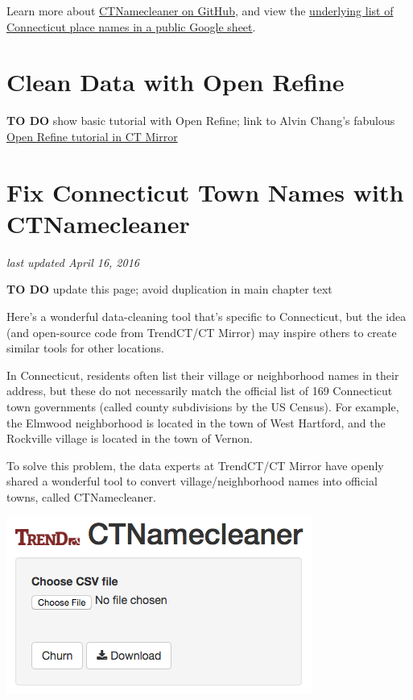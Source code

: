 \documentclass[
  english,
]{book}
\begin{document}
Learn more about \href{https://github.com/trendct/ctnamecleaner}{CTNamecleaner on GitHub}, and view the \href{https://docs.google.com/spreadsheets/d/1WqZIGk2AkHXKYvd4uXy5a2nwyg529e7mMU5610Ale0g/edit\#gid=0}{underlying list of Connecticut place names in a public Google sheet}.

\hypertarget{open-refine}{%
\section{Clean Data with Open Refine}\label{open-refine}}

\textbf{TO DO } show basic tutorial with Open Refine; link to Alvin Chang's fabulous \href{http://trendct.org/2015/04/24/john-jonathan-and-johnny-how-to-merge-them-in-open-refine/}{Open Refine tutorial in CT Mirror}

\hypertarget{ctnamecleaner}{%
\section{Fix Connecticut Town Names with CTNamecleaner}\label{ctnamecleaner}}

\emph{last updated April 16, 2016}

\textbf{TO DO} update this page; avoid duplication in main chapter text

Here's a wonderful data-cleaning tool that's specific to Connecticut, but the idea (and open-source code from TrendCT/CT Mirror) may inspire others to create similar tools for other locations.

In Connecticut, residents often list their village or neighborhood names in their address, but these do not necessarily match the official list of 169 Connecticut town governments (called county subdivisions by the US Census). For example, the Elmwood neighborhood is located in the town of West Hartford, and the Rockville village is located in the town of Vernon.

To solve this problem, the data experts at TrendCT/CT Mirror have openly shared a wonderful tool to convert village/neighborhood names into official towns, called CTNamecleaner.

\includegraphics{images/04-clean/CTNamecleaner.png}
\end{document}
